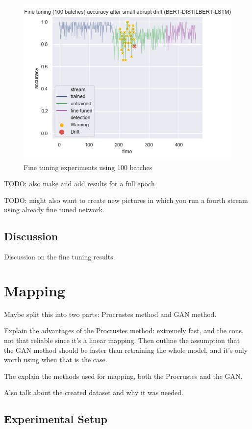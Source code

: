 \documentclass[12pt]{report}
\begin{document}
\begin{figure}[ht!]
\centering
\includegraphics[width=0.8\linewidth]{assets/addressing-change/fine_tuning_lstm_wos_1_BERT_DISTILBERT_100_batches.png}
\caption{Fine tuning experiments using 100 batches}
\label{fig:fine100}
\end{figure}

TODO: also make and add results for a full epoch

TODO: might also want to create new pictures in which you run a fourth stream using already fine tuned network.

\subsection{Discussion}

Discussion on the fine tuning results.

\section{Mapping}

Maybe split this into two parts: Procrustes method and GAN method.

Explain the advantages of the Procrustes method: extremely fast, and the cons, not that reliable since it's a linear mapping. Then outline the assumption that the GAN method should be faster than retraining the whole model, and it's only worth using when that is the case.

The explain the methods used for mapping, both the Procrustes and the GAN.

Also talk about the created dataset and why it was needed.

\subsection{Experimental Setup}
\end{document}
